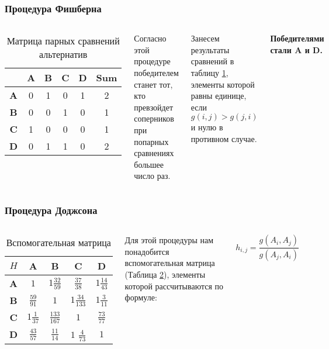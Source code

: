 \documentclass[10pt]{beamer}
\begin{document}
\begin{frame}
  \frametitle{Процедура Фишберна}
  \begin{columns}

  \begin{table}
    \caption{Матрица парных сравнений альтернатив}
    \label{t2}
    \begin{tabular}{|c|c|c|c|c|c|}
      \hline
        &\textbf{A} &	\textbf{B} &	\textbf{C} &	\textbf{D} &	\textbf{Sum}\\
        \hline
      \textbf{A} & 0 &	1 &	0 &	1 &	\cellcolor{yellow}2\\
      \textbf{B} & 0 &	0 &	1 &	0 &	1\\
      \textbf{C} & 1 &	0 &	0 &	0 &	1\\
      \textbf{D} & 0 &	1 &	1 &	0 &	\cellcolor{yellow}2\\
      \hline
    \end{tabular}
  \end{table}
  Согласно этой процедуре победителем станет тот, кто превзойдет соперников при попарных сравнениях большее число раз.

  Занесем результаты сравнений в таблицу \ref{t2}, элементы которой равны единице, если $g(i,j)>g(j,i)$ и нулю в противном случае.

  \textbf{Победителями стали A и D.}
  \end{columns}
\end{frame}

\begin{frame}
  \frametitle{Процедура Доджсона}
  \begin{columns}
    \begin{table}
      \caption{Вспомогательная матрица}
      \label{t3}
      \def\arraystretch{1.5}
      \begin{tabular}{|c|c|c|c|c|}
        \hline
        $H$ &	\textbf{A} &	\textbf{B} &	\textbf{C} &	\textbf{D} \\
        \hline
        \textbf{A} &	$1       $& 	$1  \frac{32}{59}$& 	  $\frac{37}{38}$ &	$ 1 \frac{14}{43}$\\
        \hline
        \textbf{B} &	 $\frac{59}{91}$&	$1$ & $1\frac{34}{133}$ &	$1 \frac{3}{11}$\\
        \hline
        \textbf{C} & $1\frac{1}{37}$ & 	 $\frac{133}{167}$ &	$1$  &	  $\frac{73}{77}$ \\
        \hline
        \textbf{D} &	  $\frac{43}{57}$ &	  $\frac{11}{14}$ 	& $1$   $\frac{4}{73}$ 	& $1$        \\
          \hline
      \end{tabular}
    \end{table}
    Для этой процедуры нам понадобится вспомогательная матрица (Таблица \ref{t3}), элементы которой рассчитываются по формуле:

    \begin{equation*}
      h_{i,j} = \frac{g(A_{i}, A_{j})}{g(A_{j}, A_{i})}
    \end{equation*}
  \end{columns}
\end{frame}
\end{document}

